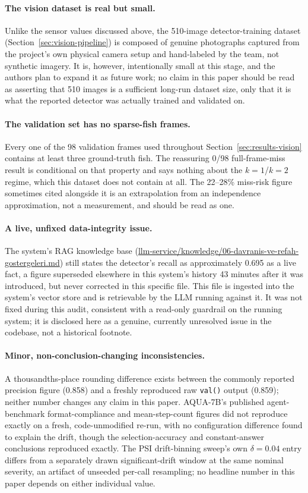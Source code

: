 \paragraph{The vision dataset is real but small.} Unlike the sensor values discussed above, the
510-image detector-training dataset (Section~\ref{sec:vision-pipeline}) is composed of genuine
photographs captured from the project's own physical camera setup and hand-labeled by the team, not
synthetic imagery. It is, however, intentionally small at this stage, and the authors plan to expand
it as future work; no claim in this paper should be read as asserting that 510 images is a
sufficient long-run dataset size, only that it is what the reported detector was actually trained
and validated on.

\paragraph{The validation set has no sparse-fish frames.} Every one of the 98 validation frames
used throughout Section~\ref{sec:results-vision} contains at least three ground-truth fish. The
reassuring 0/98 full-frame-miss result is conditional on that property and says nothing about the
$k=1$/$k=2$ regime, which this dataset does not contain at all. The 22--28\% miss-risk figure
sometimes cited alongside it is an extrapolation from an independence approximation, not a
measurement, and should be read as one.

\paragraph{A live, unfixed data-integrity issue.} The system's RAG knowledge base
(\url{llm-service/knowledge/06-davranis-ve-refah-gostergeleri.md}) still states the detector's
recall as approximately 0.695 as a live fact, a figure superseded elsewhere in this system's
history 43 minutes after it was introduced, but never corrected in this specific file. This file is
ingested into the system's vector store and is retrievable by the LLM running against it. It was
not fixed during this audit, consistent with a read-only guardrail on the running system; it is
disclosed here as a genuine, currently unresolved issue in the codebase, not a historical footnote.

\paragraph{Minor, non-conclusion-changing inconsistencies.} A thousandths-place rounding
difference exists between the commonly reported precision figure (0.858) and a freshly reproduced
raw \texttt{val()} output (0.859); neither number changes any claim in this paper. AQUA-7B's
published agent-benchmark format-compliance and mean-step-count figures did not reproduce exactly
on a fresh, code-unmodified re-run, with no configuration difference found to explain the drift,
though the selection-accuracy and constant-answer conclusions reproduced exactly. The PSI
drift-binning sweep's own $\delta=0.04$ entry differs from a separately drawn significant-drift
window at the same nominal severity, an artifact of unseeded per-call resampling; no headline
number in this paper depends on either individual value.
